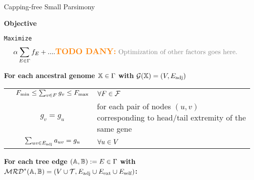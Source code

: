 \documentclass[runningheads]{llncs}
\begin{document}
\begin{algorithm}
\caption{Capping-free Small Parsimony}
\textbf{Objective}

\newcommand{\idx}{\texttt{ix}}
\hspace{0.5cm}\texttt{Maximize}
\begin{equation*}
    \alpha \sum_{\edt\in\tree} f_\edt + .... \text{\todoDany{Optimization of other factors goes here.}}
\end{equation*}

\textbf{For each ancestral genome $\mathbb{X} \in \Gamma$ with $\mathcal{G}(\mathbb{X}) = (V, E_\text{adj})$}

\begin{constraints}
\begin{tabular}{lcl}
    \cns & $F_{\text{min}} \leq \sum_{v \in F} g_v \leq F_{\text{max}}$ & $\forall F \in \mathcal F$\\
    \cns & $g_v = g_u$ & for each pair of nodes $(u, v)$ corresponding to head/tail extremity of the same gene\todoDany{improve}\\
    \cns & $\sum_{uv \in E_\text{adj}} a_{uv} = g_u$ & $\forall u \in V$\\
\end{tabular}
\end{constraints}


\medskip
\textbf{For each tree edge $(\mathbb{A},\mathbb{B}):=E\in \Gamma$ with $\mathcal{MRD}^*(\mathbb{A},\mathbb{B}) = (V\cup\mathcal{T}, E_\text{adj} \cup E_{\text{ext}} \cup E_\text{self})$:}

\begin{constraints}
\begin{tabular}{lcl}


\end{tabular}
\end{constraints}
\end{algorithm}
\end{document}
